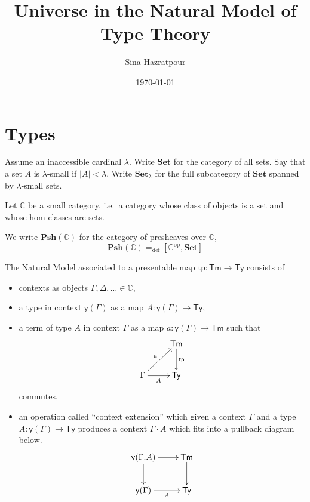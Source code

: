 \documentclass[a4paper,11pt]{article}
\title{Universe in the Natural Model of Type Theory}
\author{Sina Hazratpour}
\date{\today}
\numberwithin{equation}{section}
\theoremstyle{definition}
\theoremstyle{remark}
\newcommand{\defeq}{=_{\mathrm{def}}}
\newcommand{\op}{\mathrm{op}}
\newcommand{\co}{\colon}
\newcommand{\catC}{\mathbb{C}}
\newcommand{\tcat}{\mathbf}
\newcommand{\psh}[1]{\mathbf{Psh}(#1)} %
\newcommand{\yo}{\mathsf{y}}
\newcommand{\pshC}{\psh{\catC}}
\newcommand{\Type}{\mathsf{Ty}}
\newcommand{\Term}{\mathsf{Tm}}
\newcommand{\tp}{\mathsf{tp}}
\newcommand{\Set}{\tcat{Set}}
\begin{document}
\maketitle



\section{Types}

Assume an inaccessible cardinal $\lambda$. Write $\Set$ for the category of all sets. Say that a set $A$ is $\lambda$-small if $|A| < \lambda$.  Write $\Set_\lambda$ for the full
subcategory of $\Set$ spanned by  $\lambda$-small sets.

Let $\mathbb{C}$ be a small category, i.e.~a category whose class of objects is a set and
whose hom-classes are sets.

We write $\pshC$ for the category of presheaves over $\catC$,
\[
\pshC \defeq [\catC^\op, \Set]
\]


The Natural Model associated to a presentable map $\tp \co \Term \to \Type$ consists of
\begin{itemize}
\item contexts as objects $\Gamma, \Delta, \ldots \in \catC$,
\item a type in context $\yo (\Gamma)$ as a map $A \co \yo(\Gamma) \to \Type$,
\item a term of type $A$ in context $\Gamma$ as a map $a \co \yo(\Gamma) \to \Term$ such that
\[
\xymatrix{
 & \Term \ar[d]^{\tp} \\
\Gamma \ar[r]_-A \ar[ur]^{a} & \Type}
\]
commutes,
\item an operation called ``context extension'' which given a context $\Gamma$ and a type $A \co \yo(\Gamma) \to \Type$ produces a context $\Gamma\cdot A$ which fits into a pullback diagram below.
\[
\xymatrix{
\yo(\Gamma.A) \ar[r] \ar[d] & \Term \ar[d] \\
\yo(\Gamma) \ar[r]_-{A} & \Type}
\]
\end{itemize}

\end{document}
